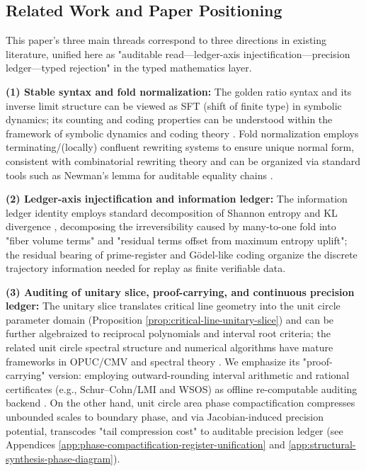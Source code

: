 \subsection{Related Work and Paper Positioning}
This paper's three main threads correspond to three directions in existing literature, unified here as "auditable read—ledger-axis injectification—precision ledger—typed rejection" in the typed mathematics layer.\par
\textbf{(1) Stable syntax and fold normalization:} The golden ratio syntax and its inverse limit structure can be viewed as SFT (shift of finite type) in symbolic dynamics; its counting and coding properties can be understood within the framework of symbolic dynamics and coding theory \cite{LindMarcus1995}. Fold normalization employs terminating/(locally) confluent rewriting systems to ensure unique normal form, consistent with combinatorial rewriting theory and can be organized via standard tools such as Newman's lemma for auditable equality chains \cite{Newman1942}.\par
\textbf{(2) Ledger-axis injectification and information ledger:} The information ledger identity employs standard decomposition of Shannon entropy and KL divergence \cite{CoverThomas2006}, decomposing the irreversibility caused by many-to-one fold into "fiber volume terms" and "residual terms offset from maximum entropy uplift"; the residual bearing of prime-register and Gödel-like coding organize the discrete trajectory information needed for replay as finite verifiable data.\par
\textbf{(3) Auditing of unitary slice, proof-carrying, and continuous precision ledger:} The unitary slice translates critical line geometry into the unit circle parameter domain (Proposition \ref{prop:critical-line-unitary-slice}) and can be further algebraized to reciprocal polynomials and interval root criteria; the related unit circle spectral structure and numerical algorithms have mature frameworks in OPUC/CMV and spectral theory \cite{CanteroMoralVelazquez2003CMV,Simon2005OPUC1,BevilacquaDelCorsoGemignani2015CMVCompanion}. We emphasize its "proof-carrying" version: employing outward-rounding interval arithmetic and rational certificates (e.g., Schur--Cohn/LMI and WSOS) as offline re-computable auditing backend \cite{DaumasLesterMunoz2007,DymYoung1990SchurCohnMatrixPolynomials,DavisPapp2023}. On the other hand, unit circle area phase compactification compresses unbounded scales to boundary phase, and via Jacobian-induced precision potential, transcodes "tail compression cost" to auditable precision ledger (see Appendices \ref{app:phase-compactification-register-unification} and \ref{app:structural-synthesis-phase-diagram}).\par

